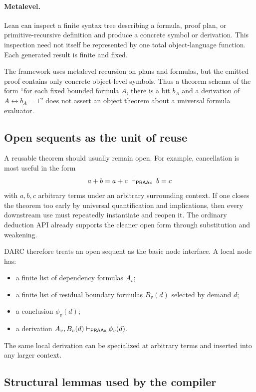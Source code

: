 \paragraph{Metalevel.}
Lean can inspect a finite syntax tree describing a formula, proof plan, or
primitive-recursive definition and produce a concrete symbol or derivation.
This inspection need not itself be represented by one total object-language
function.  Each generated result is finite and fixed.

The framework uses metalevel recursion on plans and formulas, but the emitted
proof contains only concrete object-level symbols.  Thus a theorem schema of
the form ``for each fixed bounded formula \(A\), there is a bit
\(b_A\) and a derivation of \(A\leftrightarrow b_A=1\)'' does not assert an
object theorem about a universal formula evaluator.

\subsection{Open sequents as the unit of reuse}

A reusable theorem should usually remain open.  For example, cancellation is
most useful in the form
\[
  a+b=a+c\;\vdash_{\mathsf{PRAAx}}\;b=c
\]
with \(a,b,c\) arbitrary terms under an arbitrary surrounding context.  If
one closes the theorem too early by universal quantification and implications,
then every downstream use must repeatedly instantiate and reopen it.  The
ordinary deduction API already supports the cleaner open form through
substitution and weakening.

DARC therefore treats an open sequent as the basic node interface.  A local
node has:
\begin{itemize}
  \item a finite list of dependency formulas \(A_v\);
  \item a finite list of residual boundary formulas \(B_v(d)\) selected by
        demand \(d\);
  \item a conclusion \(\phi_v(d)\);
  \item a derivation
        \(A_v,B_v(d)\vdash_{\mathsf{PRAAx}}\phi_v(d)\).
\end{itemize}
The same local derivation can be specialized at arbitrary terms and inserted
into any larger context.

\subsection{Structural lemmas used by the compiler}


